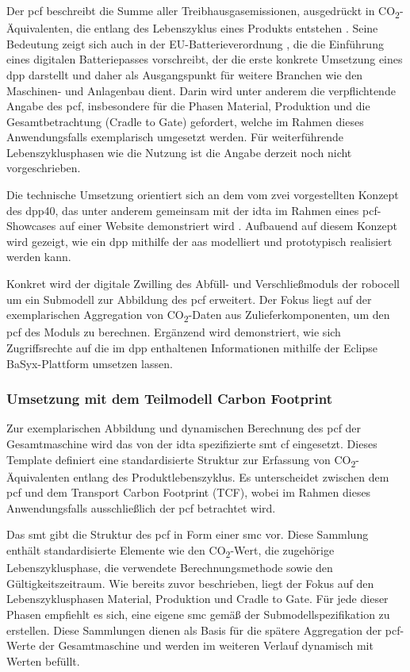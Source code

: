 Der \acs{pcf} beschreibt die Summe aller Treibhausgasemissionen, ausgedrückt in CO\textsubscript{2}-Äqui\-valenten, die entlang des Lebenszyklus eines Produkts entstehen \cite{PCF}. 
Seine Bedeutung zeigt sich auch in der EU-Batterieverordnung \cite{EUVerordnung}, die die Einführung eines digitalen Batteriepasses vorschreibt, der die erste konkrete Umsetzung eines \acs{dpp} darstellt und daher als Ausgangspunkt für weitere Branchen wie den Maschinen- und Anlagenbau dient.
Darin wird unter anderem die verpflichtende Angabe des \acs{pcf}, insbesondere für die Phasen Material, Produktion und die Gesamtbetrachtung (Cradle to Gate) gefordert, welche im Rahmen dieses Anwendungsfalls exemplarisch umgesetzt werden. 
Für weiterführende Lebenszyklusphasen wie die Nutzung ist die Angabe derzeit noch nicht vorgeschrieben.

Die technische Umsetzung orientiert sich an dem vom \acs{zvei} vorgestellten Konzept des \acs{dpp40}, das unter anderem gemeinsam mit der \acs{idta} im Rahmen eines \acs{pcf}-Showcases auf einer Website demonstriert wird \cite{PCFShowcas}.
Aufbauend auf diesem Konzept wird gezeigt, wie ein \acs{dpp} mithilfe der \acs{aas} modelliert und prototypisch realisiert werden kann.

Konkret wird der digitale Zwilling des Abfüll- und Verschließmoduls der robocell um ein Submodell zur Abbildung des \acs{pcf} erweitert. 
Der Fokus liegt auf der exemplarischen Aggregation von CO\textsubscript{2}-Daten aus Zulieferkomponenten, um den \acs{pcf} des Moduls zu berechnen. 
Ergänzend wird demonstriert, wie sich Zugriffsrechte auf die im \acs{dpp} enthaltenen Informationen mithilfe der Eclipse BaSyx-Plattform umsetzen lassen.

\subsubsection{Umsetzung mit dem Teilmodell Carbon Footprint}
Zur exemplarischen Abbildung und dynamischen Berechnung des \acs{pcf} der Gesamtmaschine wird das von der \acs{idta} spezifizierte \acs{smt} \acs{cf} \cite{SpezifikaitonPCF} eingesetzt.  
Dieses Template definiert eine standardisierte Struktur zur Erfassung von CO\textsubscript{2}-Äquivalenten entlang des Produktlebenszyklus.  
Es unterscheidet zwischen dem \acs{pcf} und dem Transport Carbon Footprint (TCF), wobei im Rahmen dieses Anwendungsfalls ausschließlich der \acs{pcf} betrachtet wird.

Das \acs{smt} gibt die Struktur des \acs{pcf} in Form einer \acs{smc} vor.  
Diese Sammlung enthält standardisierte Elemente wie den CO\textsubscript{2}-Wert, die zugehörige Lebenszyklusphase, die verwendete Berechnungsmethode sowie den Gültigkeitszeitraum.
Wie bereits zuvor beschrieben, liegt der Fokus auf den Lebenszyklusphasen Material, Produktion und Cradle to Gate.  
Für jede dieser Phasen empfiehlt es sich, eine eigene \acs{smc} gemäß der Submodellspezifikation zu erstellen.  
Diese Sammlungen dienen als Basis für die spätere Aggregation der \acs{pcf}-Werte der Gesamtmaschine und werden im weiteren Verlauf dynamisch mit Werten befüllt.

